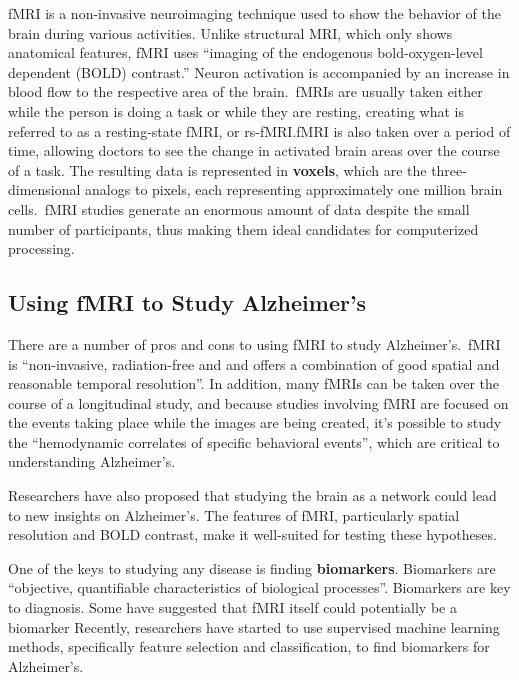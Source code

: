 \documentclass[pageno]{jpaper}
\begin{document}
fMRI is a non-invasive neuroimaging technique used to show the behavior of
the brain during various activities. Unlike structural MRI, which only
shows anatomical features, fMRI uses ``imaging of the endogenous
bold-oxygen-level dependent (BOLD) contrast.'' Neuron activation is
accompanied by an increase in blood flow to the respective
area of the brain\cite{Kvisito}.\ fMRIs are usually taken either while the
person is doing a task or while they are resting, creating what is
referred to as a resting-state fMRI, or rs-fMRI.\@ fMRI is also taken over a
period of time, allowing doctors to see the change in activated brain
areas over the course of a task. The resulting data is represented in
\textbf{voxels}, which are the three-dimensional analogs to pixels, each
representing approximately one million brain cells\cite{Yuhas2012}.\ fMRI studies
generate an enormous amount of data despite the small number of participants, thus
making them ideal candidates for computerized processing\cite{Honorio2012}.

\subsection{Using fMRI to Study Alzheimer's}
\label{sub:Using fMRI to Study Alzheimer's}

There are a number of pros and cons to using fMRI to study Alzheimer's.\ fMRI
is ``non-invasive, radiation-free and and offers a combination of good spatial
and reasonable temporal resolution''\cite{Kvisito}. In addition, many fMRIs can
be taken over the course of a longitudinal study, and because studies involving
fMRI are focused on the events taking place while the images are being created,
it's possible to study the ``hemodynamic correlates of specific behavioral events'',
which are critical to understanding Alzheimer's\cite{Dickerson2008}.

Researchers have also proposed that studying the brain as a network could lead
to new insights on Alzheimer's\cite{Khazaee2015,Li2013}. The features of fMRI,
particularly spatial resolution and BOLD contrast, make it well-suited for
testing these hypotheses.

One of the keys to studying any disease is finding \textbf{biomarkers}.
Biomarkers are ``objective, quantifiable characteristics of biological
processes''\cite{Strimbu}. Biomarkers are key to diagnosis. Some have suggested
that fMRI itself could potentially be a biomarker\cite{Sperling2011,Moradi2015}
Recently, researchers have started to use supervised machine learning methods,
specifically feature selection and classification, to find biomarkers for
Alzheimer's\cite{Orru2012,Ye2011}.
\end{document}
